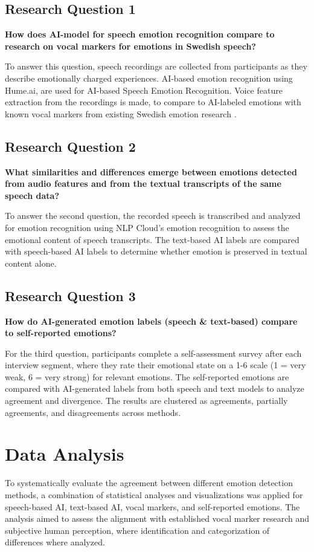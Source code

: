 \subsection{Research Question 1}
\textbf{How does AI-model for speech emotion recognition compare to research on vocal markers for emotions in Swedish speech?}

To answer this question, speech recordings are collected from participants as they describe emotionally charged experiences. AI-based emotion recognition using Hume.ai, are used for AI-based Speech Emotion Recognition. Voice feature extraction from the recordings is made, to compare to AI-labeled emotions with known vocal markers from existing Swedish emotion research \autocite{Ekberg2023}. 

\subsection{Research Question 2}
\textbf{What similarities and differences emerge between emotions detected from audio features and from the textual transcripts of the same speech data?}

To answer the second question, the recorded speech is transcribed and analyzed for emotion recognition using NLP Cloud’s emotion recognition to assess the emotional content of speech transcripts. The text-based AI labels are compared with speech-based AI labels to determine whether emotion is preserved in textual content alone. 

\subsection{Research Question 3}
\textbf{How do AI-generated emotion labels (speech \& text-based) compare to self-reported emotions? }

For the third question, participants complete a self-assessment survey after each interview segment, where they rate their emotional state on a 1-6 scale (1 = very weak, 6 = very strong) for relevant emotions. The self-reported emotions are compared with AI-generated labels from both speech and text models to analyze agreement and divergence. The results are clustered as agreements, partially agreements, and disagreements across methods. 


\section{Data Analysis}
To systematically evaluate the agreement between different emotion detection methods, a combination of statistical analyses and visualizations was applied for speech-based AI, text-based AI, vocal markers, and self-reported emotions. 
The analysis aimed to assess the alignment with established vocal marker research and subjective human perception, where identification and categorization of differences where analyzed. 

